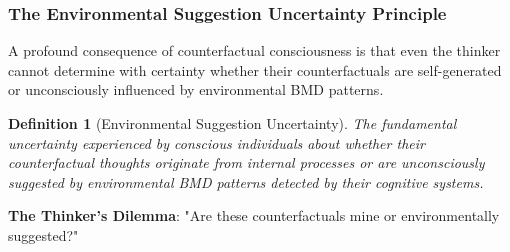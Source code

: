 \documentclass[12pt,a4paper]{article}
\newtheorem{definition}[theorem]{Definition}
\begin{document}
\subsubsection{The Environmental Suggestion Uncertainty Principle}

A profound consequence of counterfactual consciousness is that even the thinker cannot determine with certainty whether their counterfactuals are self-generated or unconsciously influenced by environmental BMD patterns.

\begin{definition}[Environmental Suggestion Uncertainty]
The fundamental uncertainty experienced by conscious individuals about whether their counterfactual thoughts originate from internal processes or are unconsciously suggested by environmental BMD patterns detected by their cognitive systems.
\end{definition}

\textbf{The Thinker's Dilemma}: "Are these counterfactuals mine or environmentally suggested?"
\end{document}
